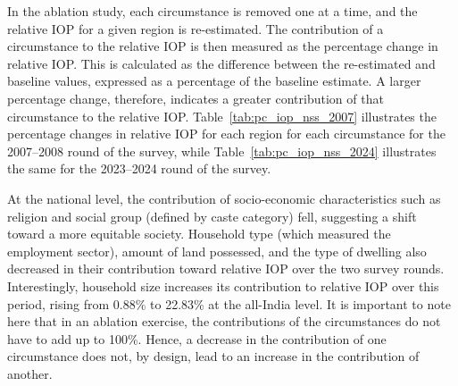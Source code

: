 \documentclass[12pt]{article}
\theoremstyle{plain}
\theoremstyle{definition}
\begin{document}
In the ablation study, each circumstance is removed one at a time, and the relative IOP for a given region is re-estimated. The contribution of a circumstance to the relative IOP is then measured as the percentage change in relative IOP. This is calculated as the difference between the re-estimated and baseline values, expressed as a percentage of the baseline estimate. A larger percentage change, therefore, indicates a greater contribution of that circumstance to the relative IOP. Table~\ref{tab:pc_iop_nss_2007} illustrates the percentage changes in relative IOP for each region for each circumstance for the 2007--2008 round of the survey, while Table~\ref{tab:pc_iop_nss_2024} illustrates the same for the 2023--2024 round of the survey.  

\begin{table}[h]
    \centering\small
    \caption{Percentage change in IOP when a given circumstance variable is not accounted for in the NSS 2007--2008 round data}
        
    \label{tab:pc_iop_nss_2007}
\end{table}

\begin{table}[h]
    \centering\small
    \caption{Percentage change in IOP when a given circumstance variable is not accounted for in the NSS 2023--2024 data}
        
    \label{tab:pc_iop_nss_2024}
\end{table}

At the national level, the contribution of socio-economic characteristics such as religion and social group (defined by caste category) fell, suggesting a shift toward a more equitable society. Household type (which measured the employment sector), amount of land possessed, and the type of dwelling also decreased in their contribution toward relative IOP over the two survey rounds. Interestingly, household size increases its contribution to relative IOP over this period, rising from 0.88\% to 22.83\% at the all-India level. It is important to note here that in an ablation exercise, the contributions of the circumstances do not have to add up to 100\%. Hence, a decrease in the contribution of one circumstance does not, by design, lead to an increase in the contribution of another.
\end{document}
